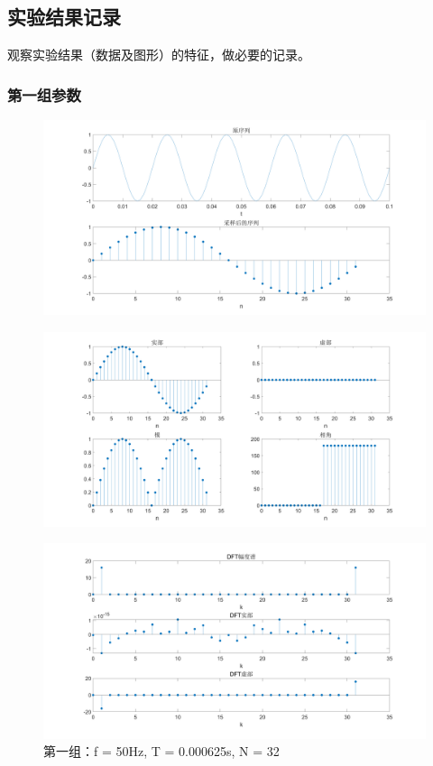 \documentclass{../source/Experiment copy}
\begin{document}
\subsection{实验结果记录}
观察实验结果（数据及图形）的特征，做必要的记录。
\subsubsection{第一组参数}
\begin{figure}[H]
    \centering
    \includegraphics[width = \textwidth]{src/exp2_1_1.png}
\end{figure}

\begin{figure}[H]
    \centering
    \includegraphics[width = \textwidth]{src/exp2_1_2.png}
\end{figure}

\begin{figure}[H]
    \centering
    \includegraphics[width = \textwidth]{src/exp2_1_3.png}
    \caption{第一组：f = 50Hz, T = 0.000625s, N = 32}
\end{figure}
\end{document}
